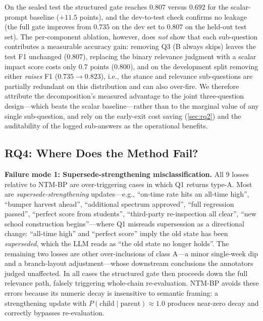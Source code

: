 \documentclass{article}
\theoremstyle{definition}
\begin{document}
On the sealed test the structured gate reaches $0.807$ versus $0.692$ for
the scalar-prompt baseline ($+11.5$ points), and the dev-to-test check
confirms no leakage (the full gate improves from $0.735$ on the dev set to
$0.807$ on the held-out test set).  The per-component ablation, however,
does \emph{not} show that each sub-question contributes a measurable
accuracy gain: removing Q3 (B always skips) leaves the test F1 unchanged
($0.807$), replacing the binary relevance judgment with a scalar impact
score costs only $0.7$ points ($0.800$), and on the development split
removing either \emph{raises} F1 ($0.735\to 0.823$), i.e., the stance and
relevance sub-questions are partially redundant on this distribution and
can also over-fire.  We therefore attribute the decomposition's measured
advantage to the joint three-question design---which beats the scalar
baseline---rather than to the marginal value of any single sub-question,
and rely on the early-exit cost saving (\cref{sec:rq2}) and the
auditability of the logged sub-answers as the operational benefits.

\subsection{RQ4: Where Does the Method Fail?}
\label{sec:rq4}

\textbf{Failure mode 1: Supersede-strengthening misclassification.}
All 9 losses relative to NTM-BP are over-triggering cases in which Q1
returns type-A.  Most are \emph{supersede-strengthening} updates---e.g.,
``on-time rate hits an all-time high'', ``bumper harvest ahead'',
``additional spectrum approved'', ``full regression passed'', ``perfect
score from students'', ``third-party re-inspection all clear'', ``new
school construction begins''---where Q1 misreads supersession as a
directional change: ``all-time high'' and ``perfect score'' imply the
old state has been \emph{superseded}, which the LLM reads as ``the old
state no longer holds''.  The remaining two losses are other
over-inclusions of class A---a minor single-week dip and a branch-layout
adjustment---whose downstream conclusions the annotators judged
unaffected.  In all cases the structured gate then proceeds down the full
relevance path, falsely triggering whole-chain re-evaluation.  NTM-BP avoids these errors
because its numeric decay is insensitive to semantic framing: a
strengthening update with
$P(\text{child}\mid\text{parent})\approx1.0$ produces near-zero decay
and correctly bypasses re-evaluation.
\end{document}
